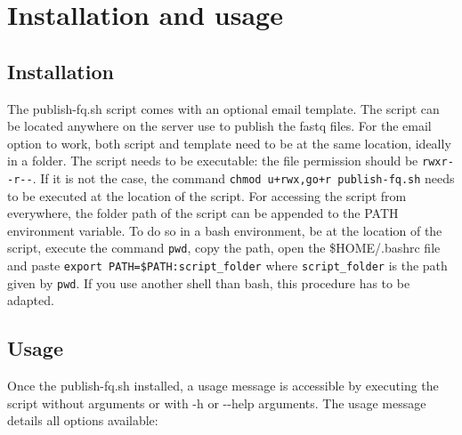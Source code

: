 \documentclass[11pt]{report}
\begin{document}
 \chapter*{Installation and usage}
\setcounter{section}{0}

 \section{Installation}

The publish-fq.sh script comes with an optional email template. The script can be located anywhere on the server use to publish the fastq files. For the email option to work, both script and template need to be at the same location, ideally in a folder. The script needs to be executable: the file permission should be \lstinline[basicstyle=\ttfamily]{rwxr--r--}. If it is not the case, the command \lstinline[basicstyle=\ttfamily]{chmod u+rwx,go+r publish-fq.sh} needs to be executed at the location of the script. For accessing the script from everywhere, the folder path of the script can be appended to the PATH environment variable. To do so in a bash environment, be at the location of the script, execute the command \lstinline[basicstyle=\ttfamily]{pwd}, copy the path, open the \$HOME/.bashrc file and paste \lstinline[basicstyle=\ttfamily]{export PATH=$PATH:script_folder} where \lstinline[basicstyle=\ttfamily]{script_folder} is the path given by \lstinline[basicstyle=\ttfamily]{pwd}. If you use another shell than bash, this procedure has to be adapted.


 \section{Usage}

Once the publish-fq.sh installed, a usage message is accessible by executing the script without arguments or with -h or -{}-help arguments. The usage message details all options available:
\end{document}
